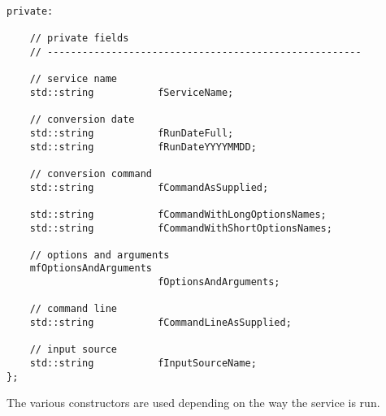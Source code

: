 \begin{lstlisting}[language=CPlusPlus]
  private:

    // private fields
    // ------------------------------------------------------

    // service name
    std::string           fServiceName;

    // conversion date
    std::string           fRunDateFull;
    std::string           fRunDateYYYYMMDD;

    // conversion command
    std::string           fCommandAsSupplied;

    std::string           fCommandWithLongOptionsNames;
    std::string           fCommandWithShortOptionsNames;

    // options and arguments
    mfOptionsAndArguments
                          fOptionsAndArguments;

    // command line
    std::string           fCommandLineAsSupplied;

    // input source
    std::string           fInputSourceName;
};
\end{lstlisting}

The various constructors are used depending on the way the service is run.

